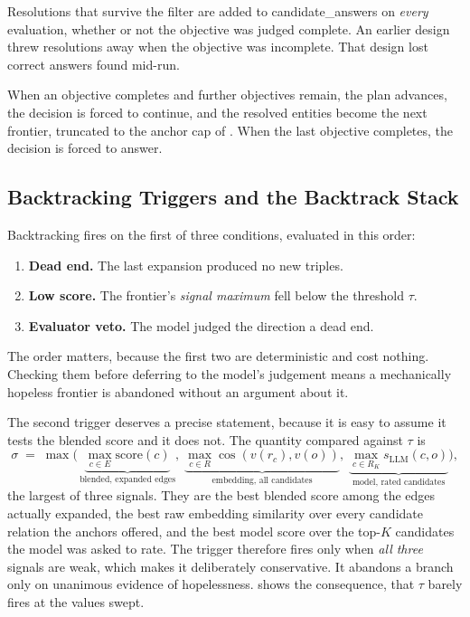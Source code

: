 Resolutions that survive the filter are added to \textsf{candidate\_answers} on
\emph{every} evaluation, whether or not the objective was judged complete. An
earlier design threw resolutions away when the objective was incomplete. That
design lost correct answers found mid-run.

When an objective completes and further objectives remain, the plan advances,
the decision is forced to \textsf{continue}, and the resolved entities become
the next frontier, truncated to the anchor cap of . When the
last objective completes, the decision is forced to \textsf{answer}.

\subsection{Backtracking Triggers and the Backtrack
Stack}\label{sec:backtracking}

Backtracking fires on the first of three conditions,
evaluated in this order:

\begin{enumerate}
  \item \textbf{Dead end.} The last expansion produced no new triples.
  \item \textbf{Low score.} The frontier's \emph{signal maximum} fell below the
  threshold $\tau$.
  \item \textbf{Evaluator veto.} The model judged the direction a dead end.
\end{enumerate}

The order matters, because the first two are deterministic and cost nothing.
Checking them before deferring to the model's judgement means a mechanically
hopeless frontier is abandoned without an argument about it.

The second trigger deserves a precise statement, because it is easy to assume it
tests the blended score and it does not. The quantity compared against $\tau$ is
\[ \sigma \;=\; \max\bigl(\,\underbrace{\max_{c \in E} \mathrm{score}(c)}
_{\text{blended, expanded edges}},\; \underbrace{\max_{c \in R} \cos(v(r_c),
v(o))}_{\text{embedding, all candidates}},\; \underbrace{\max_{c \in R_{K}}
s_{\mathrm{LLM}}(c, o)}_{\text{model, rated candidates}}\bigr), \] the largest
of three signals. They are the best blended score among the edges actually
expanded, the best raw embedding similarity over every candidate relation the
anchors offered, and the best model score over the top-$K$ candidates the model
was asked to rate. The trigger therefore fires only when \emph{all three}
signals are weak, which makes it deliberately conservative. It abandons a branch
only on unanimous evidence of hopelessness.  shows the
consequence, that $\tau$ barely fires at the values swept.

